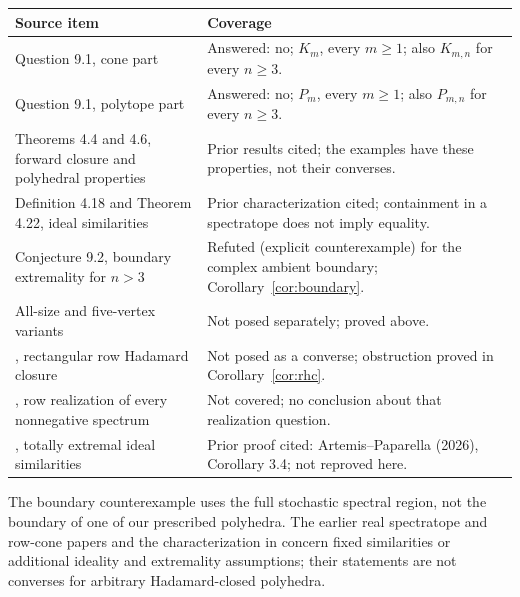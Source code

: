 \documentclass[11pt,a4paper]{article}
\begin{document}
\begin{center}
\begin{tabular}{@{}>{\raggedright\arraybackslash}p{.36\linewidth}>{\raggedright\arraybackslash}p{.56\linewidth}@{}}
\toprule
Source item&Coverage\\
\midrule
Question 9.1, cone part&Answered: no; $K_m$, every $m\geq1$;
also $K_{m,n}$ for every $n\geq3$.\\
Question 9.1, polytope part&Answered: no; $P_m$, every $m\geq1$;
also $P_{m,n}$ for every $n\geq3$.\\
Theorems 4.4 and 4.6, forward closure and polyhedral properties&
Prior results cited; the examples have these properties, not their converses.\\
Definition 4.18 and Theorem 4.22, ideal similarities&
Prior characterization cited; containment in a spectratope does not imply equality.\\
Conjecture 9.2, boundary extremality for $n>3$&Refuted (explicit counterexample)
for the complex ambient boundary; Corollary~\ref{cor:boundary}.\\
All-size and five-vertex variants&Not posed separately; proved above.\\
\cite[Definition 2.3]{JP17}, rectangular row Hadamard closure&
Not posed as a converse; obstruction proved in Corollary~\ref{cor:rhc}.\\
\cite[Remark 3.4]{JP17}, row realization of every nonnegative spectrum&
Not covered; no conclusion about that realization question.\\
\cite[Conjecture 7.1]{GLP26}, totally extremal ideal similarities&
Prior proof cited: Artemis--Paparella (2026), Corollary 3.4; not reproved here.\\
\bottomrule
\end{tabular}
\end{center}
The boundary counterexample uses the full stochastic spectral region,
not the boundary of one of our prescribed polyhedra.
The earlier real spectratope and row-cone papers \cite{JP16,JP17} and
the characterization in \cite[Corollary~3.4]{AP26} concern fixed
similarities or additional ideality and extremality assumptions;
their statements are not converses for arbitrary Hadamard-closed polyhedra.
\end{document}
